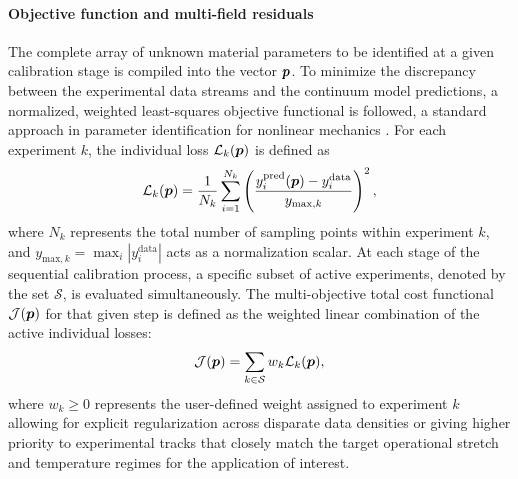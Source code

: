 \paragraph{Objective function and multi-field residuals}
The complete array of unknown material parameters to be identified at a given calibration stage is compiled into the vector $\boldsymbol{p}$. To minimize the discrepancy between the experimental data streams and the continuum model predictions, a normalized, weighted least-squares objective functional is followed, a standard approach in parameter identification for nonlinear mechanics \cite{Tarantola_Inverse}. For each experiment $k$, the individual loss $\mathcal{L}_k(\boldsymbol{p})$ is defined as
%
\begin{equation}
  \label{eqn:individual_loss}
  \mathcal{L}_k(\boldsymbol{p}) = \frac{1}{N_k} \sum_{i=1}^{N_k} \left(
    \frac{y_i^\text{pred}(\boldsymbol{p}) - y_i^\text{data}}{y_{\text{max},k}}
  \right)^2,
\end{equation}
%
where $N_k$ represents the total number of sampling points within experiment $k$, and $y_{\text{max},k} = \max_i |y_i^\text{data}|$ acts as a normalization scalar.
At each stage of the sequential calibration process, a specific subset of active experiments, denoted by the set $\mathcal{S}$, is evaluated simultaneously. The multi-objective total cost functional $\mathcal{J}(\boldsymbol{p})$ for that given step is defined as the weighted linear combination of the active individual losses:
%
\begin{equation}
    \label{eqn:total_loss}
    \mathcal{J}(\boldsymbol{p}) = \sum_{k\in\mathcal{S}} w_k \mathcal{L}_k(\boldsymbol{p}),
\end{equation}
%
where $w_k \ge 0$ represents the user-defined weight assigned to experiment $k$ allowing for explicit regularization across disparate data densities or giving higher priority to experimental tracks that closely match the target operational stretch and temperature regimes for the application of interest.


